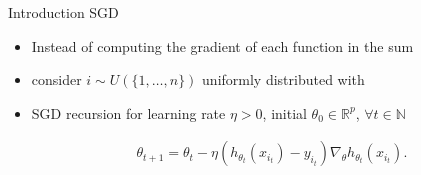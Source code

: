 \documentclass[fleqn]{beamer}
\begin{document}
    \begin{frame}{Introduction SGD}

        \begin{itemize}[<+->]
            \item Instead of computing the gradient of each function in the
                sum \item consider $i \sim U(\{1,\ldots,n\} )$ uniformly distributed with
            \item SGD recursion for learning rate $\eta > 0$, initial $\theta_0
                \in \mathbb{R}^{p}$, $\forall t \in \mathbb{N}$
        \begin{center}
            \begin{minipage}{0.5\textwidth}
                \begin{align*}
                    \theta_{t+1} = \theta_t - \eta\left(h_{\theta_t}(x_{i_t})
                    - y_{i_t}\right)
                    \nabla_{\theta} h_{\theta_t}(x_{i_t}).
                \end{align*}
            \end{minipage}
        \end{center}
        \end{itemize}

    \end{frame}
\end{document}
